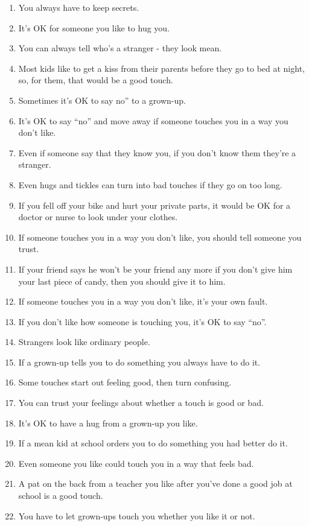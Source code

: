 \begin{enumerate}
	\item You always have to keep secrets.
	\item It's OK for someone you like to hug you.
	\item You can always tell who's a stranger - they look mean.
	\item Most kids like to get a kiss from their parents before they go to bed at night, so, for them, that would be a good touch.
	\item Sometimes it's OK to say no'' to a grown-up.
	\item It's OK to say ``no'' and move away if someone touches you in a way you don't like.
	\item Even if someone say that they know you, if you don't know them they're a stranger.
	\item Even hugs and tickles can turn into bad touches if they go on too long.
	\item If you fell off your bike and hurt your private parts, it would be OK for a doctor or nurse to look under your clothes.
	\item If someone touches you in a way you don't like, you should tell someone you trust.
	\item If your friend says he won't be your friend any more if you don't give him your last piece of candy, then you should give it to him.
	\item If someone touches you in a way you don't like, it's your own fault.
	\item If you don't like how someone is touching you, it's OK to say ``no''.
	\item Strangers look like ordinary people.
	\item If a grown-up tells you to do something you always have to do it.
	\item Some touches start out feeling good, then turn confusing.
	\item You can trust your feelings about whether a touch is good or bad.
	\item It's OK to have a hug from a grown-up you like.
	\item If a mean kid at school orders you to do something you had better do it.
	\item Even someone you like could touch you in a way that feels bad.
	\item A pat on the back from a teacher you like after you've done a good job at school is a good touch.
	\item You have to let grown-ups touch you whether you like it or not.

\end{enumerate}
